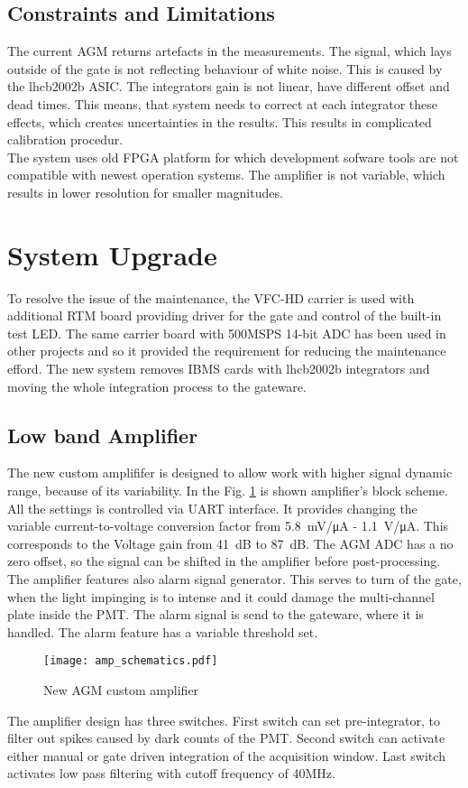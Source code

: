 \subsection{Constraints and Limitations}
The current AGM returns artefacts in the measurements. The signal, which lays
outside of the gate is not reflecting behaviour of white noise. This is caused
by the lhcb2002b ASIC. The integrators gain is not linear, have different
offset and dead times. This means, that system needs to correct at each
integrator these effects, which creates uncertainties in the results. This
results in complicated calibration procedur.\\
The system uses old FPGA platform for which development sofware tools are not
compatible with newest operation systems. The amplifier is not variable, which
results in lower resolution for smaller magnitudes.

\section{System Upgrade}
To resolve the issue of the maintenance, the VFC-HD carrier is used with
additional RTM board providing driver for the gate and control of the built-in
test LED. The same carrier board with 500MSPS 14-bit ADC has been used in other
projects and so it provided the requirement for reducing the maintenance efford.
The new system removes IBMS cards with lhcb2002b integrators and moving the
whole integration process to the gateware.

\subsection{Low band Amplifier}
The new custom amplififer is designed to allow work with higher signal dynamic
range, because of its variability.  
In the Fig. \ref{fig:amp_schematics} is shown amplifier's block scheme. All the
settings is controlled via UART interface. It provides changing the variable
current-to-voltage conversion factor from \SI{5.8}{mV/\micro A} -
\SI{1.1}{V/\micro A}. This corresponds to the Voltage gain from \SI{41}{dB} to
\SI{87}{dB}. The AGM ADC has a no zero offset, so the signal can be shifted in the
amplifier before post-processing.\\
The amplifier features also alarm signal generator. This serves to turn of the
gate, when the light impinging is to intense and it could damage the
multi-channel plate inside the PMT. The alarm signal is send to the gateware,
where it is handled. The alarm feature has a variable threshold set.   
\begin{figure}[!tbh]
    \centering
    \texttt{[image: amp\_schematics.pdf]}
    \caption{New AGM custom amplifier}
    \label{fig:amp_schematics}
\end{figure}
The amplifier design has three switches. First switch can set pre-integrator,
to filter out spikes caused by dark counts of the PMT. Second switch can
activate either manual or gate driven integration of the acquisition window.  
Last switch activates low pass filtering with cutoff frequency of 40MHz.


